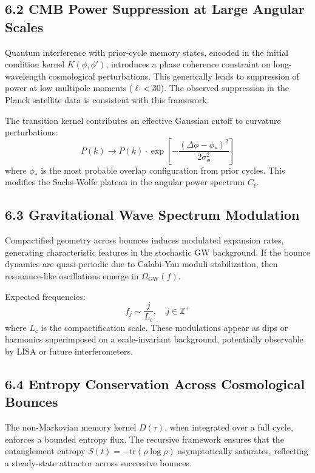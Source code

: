 \subsection*{6.2 CMB Power Suppression at Large Angular Scales}

Quantum interference with prior-cycle memory states, encoded in the initial condition kernel \( K(\phi, \phi') \), introduces a phase coherence constraint on long-wavelength cosmological perturbations. This generically leads to suppression of power at low multipole moments (\( \ell < 30 \)). The observed suppression in the Planck satellite data is consistent with this framework.

The transition kernel contributes an effective Gaussian cutoff to curvature perturbations:
\[
P(k) \rightarrow P(k) \cdot \exp\left[-\frac{(\Delta \phi - \phi_*)^2}{2\sigma_\phi^2}\right]
\]
where \( \phi_* \) is the most probable overlap configuration from prior cycles. This modifies the Sachs-Wolfe plateau in the angular power spectrum \( C_\ell \).

\subsection*{6.3 Gravitational Wave Spectrum Modulation}

Compactified geometry across bounces induces modulated expansion rates, generating characteristic features in the stochastic GW background. If the bounce dynamics are quasi-periodic due to Calabi-Yau moduli stabilization, then resonance-like oscillations emerge in \( \Omega_{\text{GW}}(f) \).

Expected frequencies:
\[
f_j \sim \frac{j}{L_c}, \quad j \in \mathbb{Z}^+
\]
where \( L_c \) is the compactification scale. These modulations appear as dips or harmonics superimposed on a scale-invariant background, potentially observable by LISA or future interferometers.

\subsection*{6.4 Entropy Conservation Across Cosmological Bounces}

The non-Markovian memory kernel \( D(\tau) \), when integrated over a full cycle, enforces a bounded entropy flux. The recursive framework ensures that the entanglement entropy \( S(t) = -\mathrm{tr}(\rho \log \rho) \) asymptotically saturates, reflecting a steady-state attractor across successive bounces.

